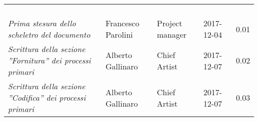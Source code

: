 \newpage 
\section*{}
\begin{table}[H]
	\centering
	\begin{tabular}{p{4cm}|C{3cm}|C{3cm}|R{2.5cm}|R{2cm}}
		
		 & & & & \\
		
		
		\emph{}	 & & & & \\
		\hline
		
		& & & & \\
		\hline
		
		& & & & \\
		\hline
		
		\emph{Prima stesura dello scheletro del documento} & Francesco Parolini & Project manager & 2017-12-04 & 0.01 \\
		
		\emph{Scrittura della sezione ''Fornitura'' dei processi primari} & Alberto Gallinaro & Chief Artist & 2017-12-07 & 0.02 \\
		\emph{Scrittura della sezione ''Codifica'' dei processi primari} & Alberto Gallinaro & Chief Artist & 2017-12-07 & 0.03 \\
		
	\end{tabular}
	
\end{table}


\clearpage